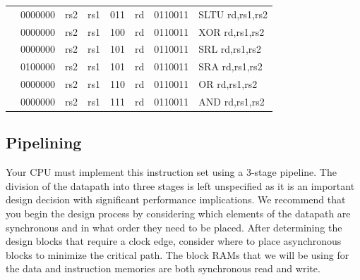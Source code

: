 \documentclass[11pt]{article}
\begin{document}
{\begin{table}[H]
\begin{small}
\begin{center}
\begin{tabular}{p{0in}p{0.4in}p{0.05in}p{0.05in}p{0.05in}p{0.05in}p{0.4in}p{0.6in}p{0.4in}p{0.6in}p{0.7in}l}
&
\multicolumn{4}{|c|}{0000000} &
\multicolumn{2}{c|}{rs2} &
\multicolumn{1}{c|}{rs1} &
\multicolumn{1}{c|}{011} &
\multicolumn{1}{c|}{rd} &
\multicolumn{1}{c|}{0110011} & SLTU rd,rs1,rs2 \\
\cline{2-11}


&
\multicolumn{4}{|c|}{0000000} &
\multicolumn{2}{c|}{rs2} &
\multicolumn{1}{c|}{rs1} &
\multicolumn{1}{c|}{100} &
\multicolumn{1}{c|}{rd} &
\multicolumn{1}{c|}{0110011} & XOR rd,rs1,rs2 \\
\cline{2-11}


&
\multicolumn{4}{|c|}{0000000} &
\multicolumn{2}{c|}{rs2} &
\multicolumn{1}{c|}{rs1} &
\multicolumn{1}{c|}{101} &
\multicolumn{1}{c|}{rd} &
\multicolumn{1}{c|}{0110011} & SRL rd,rs1,rs2 \\
\cline{2-11}


&
\multicolumn{4}{|c|}{0100000} &
\multicolumn{2}{c|}{rs2} &
\multicolumn{1}{c|}{rs1} &
\multicolumn{1}{c|}{101} &
\multicolumn{1}{c|}{rd} &
\multicolumn{1}{c|}{0110011} & SRA rd,rs1,rs2 \\
\cline{2-11}


&
\multicolumn{4}{|c|}{0000000} &
\multicolumn{2}{c|}{rs2} &
\multicolumn{1}{c|}{rs1} &
\multicolumn{1}{c|}{110} &
\multicolumn{1}{c|}{rd} &
\multicolumn{1}{c|}{0110011} & OR rd,rs1,rs2 \\
\cline{2-11}


&
\multicolumn{4}{|c|}{0000000} &
\multicolumn{2}{c|}{rs2} &
\multicolumn{1}{c|}{rs1} &
\multicolumn{1}{c|}{111} &
\multicolumn{1}{c|}{rd} &
\multicolumn{1}{c|}{0110011} & AND rd,rs1,rs2 \\
\cline{2-11}

\end{tabular}
\end{center}
\end{small}

\end{table}
}


\subsection{Pipelining}
Your CPU must implement this instruction set using a 3-stage pipeline. The division of the datapath into three stages is left unspecified as it is an important design decision with significant performance implications. We recommend that you begin the design process by considering which elements of the datapath are synchronous and in what order they need to be placed. After determining the design blocks that require a clock edge, consider where to place asynchronous blocks to minimize the critical path. The block RAMs that we will be using for the data and instruction memories are both synchronous read and write.
\end{document}
